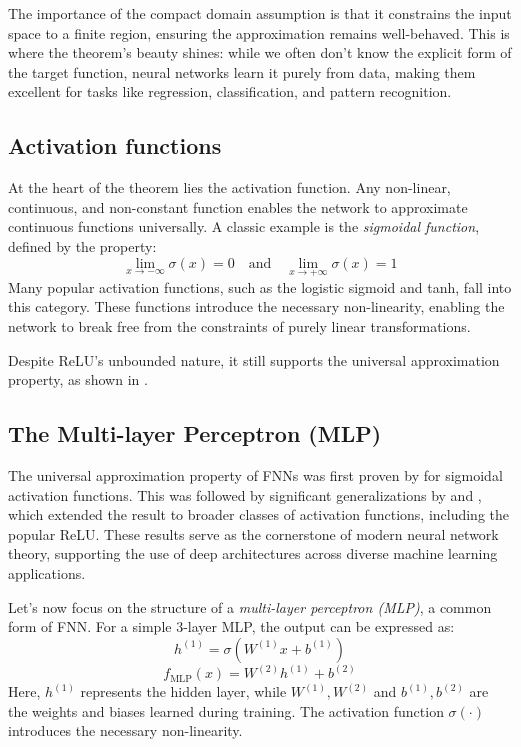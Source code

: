 \documentclass{article}
\theoremstyle{definition}
\theoremstyle{remark}
\begin{document}
The importance of the compact domain assumption is that it constrains the input space to a finite region, ensuring the approximation remains well-behaved.
This is where the theorem’s beauty shines: while we often don’t know the explicit form of the target function, neural networks learn it purely from data, making them excellent for tasks like regression, classification, and pattern recognition.



\subsection{Activation functions} %
At the heart of the theorem lies the activation function. Any non-linear, continuous, and non-constant function enables the network to approximate continuous functions universally.
A classic example is the \textit{sigmoidal function}, defined by the property:
\[
\lim_{x \to -\infty} \sigma(x) = 0 \quad \text{and} \quad \lim_{x \to +\infty} \sigma(x) = 1
\]
Many popular activation functions, such as the logistic sigmoid and tanh, fall into this category.
These functions introduce the necessary non-linearity, enabling the network to break free from the constraints of purely linear transformations.

Despite ReLU's unbounded nature, it still supports the universal approximation property, as shown in \citep{yarotsky2017error}.



\subsection{The Multi-layer Perceptron (MLP)}

The universal approximation property of FNNs was first proven by \citep{cybenko1989approximation} for sigmoidal activation functions. This was followed by significant generalizations by \citep{hornik1989multilayer} and \citep{funahashi1989approximate}, which extended the result to broader classes of activation functions, including the popular ReLU.
These results serve as the cornerstone of modern neural network theory, supporting the use of deep architectures across diverse machine learning applications.


Let’s now focus on the structure of a \textit{multi-layer perceptron (MLP)}, a common form of FNN. For a simple 3-layer MLP, the output can be expressed as:
\[
h^{(1)} = \sigma(W^{(1)} x + b^{(1)})
\]
\[
f_{\text{MLP}}(x) = W^{(2)} h^{(1)} + b^{(2)}
\]
Here, \(h^{(1)}\) represents the hidden layer, while \(W^{(1)}, W^{(2)}\) and \(b^{(1)}, b^{(2)}\) are the weights and biases learned during training. The activation function \(\sigma(\cdot)\) introduces the necessary non-linearity.
\end{document}
